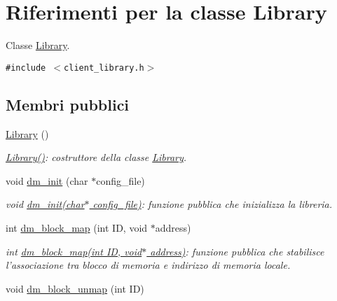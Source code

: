 \hypertarget{classLibrary}{
\section{Riferimenti per la classe Library}
\label{classLibrary}
}
Classe \hyperlink{classLibrary}{Library}.  


{\tt \#include $<$client\_\-library.h$>$}

\subsection*{Membri pubblici}
\begin{CompactItemize}
\item 
\hyperlink{classLibrary_82338219d8bf51962ff5f60a0db21b19_82338219d8bf51962ff5f60a0db21b19}{Library} ()
\begin{CompactList}\small\item\em \hyperlink{classLibrary_82338219d8bf51962ff5f60a0db21b19_82338219d8bf51962ff5f60a0db21b19}{Library()}: costruttore della classe \hyperlink{classLibrary}{Library}. \item\end{CompactList}\item 
void \hyperlink{classLibrary_ddfd88aedfe05852d065db2644172c52_ddfd88aedfe05852d065db2644172c52}{dm\_\-init} (char $\ast$config\_\-file)
\begin{CompactList}\small\item\em void \hyperlink{classLibrary_ddfd88aedfe05852d065db2644172c52_ddfd88aedfe05852d065db2644172c52}{dm\_\-init(char$\ast$ config\_\-file)}: funzione pubblica che inizializza la libreria. \item\end{CompactList}\item 
int \hyperlink{classLibrary_e65e1654765c8a7d764ea9638b735c6f_e65e1654765c8a7d764ea9638b735c6f}{dm\_\-block\_\-map} (int ID, void $\ast$address)
\begin{CompactList}\small\item\em int \hyperlink{classLibrary_e65e1654765c8a7d764ea9638b735c6f_e65e1654765c8a7d764ea9638b735c6f}{dm\_\-block\_\-map(int ID, void$\ast$ address)}: funzione pubblica che stabilisce l'associazione tra blocco di memoria e indirizzo di memoria locale. \item\end{CompactList}\item 
void \hyperlink{classLibrary_f9cacba594b2d8ad1f01d73755ef79aa_f9cacba594b2d8ad1f01d73755ef79aa}{dm\_\-block\_\-unmap} (int ID)

\end{CompactItemize}
